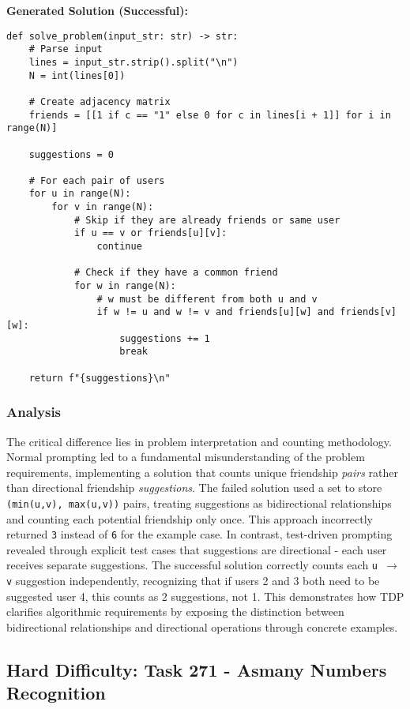 \documentclass{article}
\begin{document}
\textbf{Generated Solution (Successful):}
\begin{lstlisting}
def solve_problem(input_str: str) -> str:
    # Parse input
    lines = input_str.strip().split("\n")
    N = int(lines[0])

    # Create adjacency matrix
    friends = [[1 if c == "1" else 0 for c in lines[i + 1]] for i in range(N)]

    suggestions = 0

    # For each pair of users
    for u in range(N):
        for v in range(N):
            # Skip if they are already friends or same user
            if u == v or friends[u][v]:
                continue

            # Check if they have a common friend
            for w in range(N):
                # w must be different from both u and v
                if w != u and w != v and friends[u][w] and friends[v][w]:
                    suggestions += 1
                    break

    return f"{suggestions}\n"
\end{lstlisting}

\subsubsection{Analysis}

The critical difference lies in problem interpretation and counting methodology. Normal prompting led to a fundamental misunderstanding of the problem requirements, implementing a solution that counts unique friendship \textit{pairs} rather than directional friendship \textit{suggestions}. The failed solution used a set to store \texttt{(min(u,v), max(u,v))} pairs, treating suggestions as bidirectional relationships and counting each potential friendship only once. This approach incorrectly returned \texttt{3} instead of \texttt{6} for the example case. In contrast, test-driven prompting revealed through explicit test cases that suggestions are directional - each user receives separate suggestions. The successful solution correctly counts each \texttt{u $\rightarrow$ v} suggestion independently, recognizing that if users 2 and 3 both need to be suggested user 4, this counts as 2 suggestions, not 1. This demonstrates how TDP clarifies algorithmic requirements by exposing the distinction between bidirectional relationships and directional operations through concrete examples.

\subsection{Hard Difficulty: Task 271 - Asmany Numbers Recognition}
\label{appendix:task271}
\end{document}
